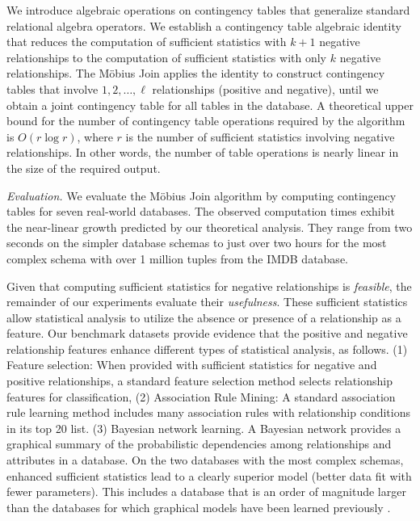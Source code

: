 \documentclass{acm_proc_article-sp}
\begin{document}
We introduce algebraic operations on contingency tables that generalize standard relational algebra operators. 
We establish a contingency table algebraic identity that reduces the computation of sufficient statistics with $k+1$ negative relationships to the computation of sufficient statistics with only $k$ negative relationships. 
The M\"obius Join applies the identity to construct contingency tables that involve $1,2,\ldots,\ell$ relationships (positive and negative), until we obtain a joint contingency table for all tables in the database. A theoretical upper bound for the number of contingency table operations required by the algorithm is $O(r \log r)$,  where $r$ is the number of sufficient statistics involving negative relationships. In other words, the number of table operations is nearly linear in the size of the required output. 

\emph{Evaluation.} We evaluate the M\"obius Join algorithm by computing contingency tables for seven real-world databases. The observed computation times exhibit the near-linear growth predicted by our theoretical analysis. 
They range from two seconds on the simpler database schemas to just over two hours for the most complex schema with over 1 million tuples from the IMDB database.


Given that computing sufficient statistics for negative relationships is {\em feasible}, the remainder of our experiments evaluate their {\em usefulness}. These sufficient statistics allow statistical analysis to utilize the absence or presence of a relationship as a feature. 
Our benchmark datasets provide evidence that the positive and negative relationship features enhance different types of statistical analysis, as follows. (1) Feature selection: When provided with sufficient statistics for negative and positive relationships,
a standard feature selection method selects relationship features for classification,
(2) Association Rule Mining: A standard association rule learning method includes many association rules with relationship conditions in its top 20 list. 
(3) Bayesian network learning. A Bayesian network provides a graphical summary of the probabilistic dependencies among relationships and attributes in a database. On the two databases with the most complex schemas, enhanced sufficient statistics lead to a clearly superior model (better data fit with fewer parameters). This includes a database that is an order of magnitude larger than the databases for which graphical models  have been learned previously \cite{Schulte2012}. 
\end{document}
